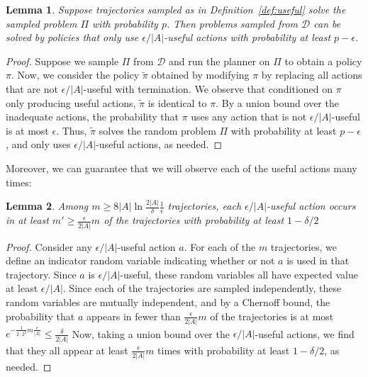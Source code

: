 \documentclass[letterpaper]{article} %
\newtheorem{lemma}{Lemma}
\begin{document}
\begin{lemma}\label{lem:only-useful}
Suppose trajectories sampled as in Definition~\ref{def:useful} solve the sampled problem $\Pi$ with probability $p$.
Then problems sampled from $\mathcal{D}$ can be solved by policies that only use $\epsilon/|A|$-useful actions with probability at least $p-\epsilon$.
\end{lemma}
\begin{proof}
Suppose we sample $\Pi$ from $\mathcal{D}$ and run the planner on $\Pi$ to obtain a policy $\pi$. 
Now, we consider the policy $\tilde{\pi}$ obtained by modifying $\pi$ by replacing all actions that are not $\epsilon/|A|$-useful with termination. We observe that conditioned on $\pi$ only producing useful actions, $\tilde{\pi}$ is identical to $\pi$. By a union bound over the inadequate actions, the probability that $\pi$ uses any action that is not $\epsilon/|A|$-useful is at most $\epsilon$.  Thus, $\tilde{\pi}$ solves the random problem $\Pi$ with probability at least $p-\epsilon$, and only uses $\epsilon/|A|$-useful actions, as needed.
\end{proof}

\noindent
Moreover, 
we can guarantee that we will observe each of the useful actions many times:

\begin{lemma}\label{lem:many-useful}
Among  $m \geq 8|A|\ln\frac{2|A|}{\delta}\frac{1}{\epsilon}$
trajectories, each $\epsilon/|A|$-useful action occurs in at least
$m' \geq \frac{\epsilon}{2|A|}m$
of the trajectories with probability at least $1-\delta/2$
\end{lemma}
\begin{proof}
Consider any $\epsilon/|A|$-useful action $a$. For each of the $m$ trajectories, we define an indicator random variable indicating whether or not $a$ is used in that trajectory. Since $a$ is $\epsilon/|A|$-useful, these random variables all have expected value at least $\epsilon/|A|$. Since each of the trajectories are sampled independently, these random variables are mutually independent, and by a Chernoff bound, the probability that $a$ appears in fewer than $\frac{\epsilon}{2|A|}m$ of the trajectories is at most
$
e^{-\frac{1}{2\cdot 2^2}m\frac{\epsilon}{|A|}}\leq\frac{\delta}{2|A|}
$
Now, taking a union bound over the $\epsilon/|A|$-useful actions, we find that they all appear at least $\frac{\epsilon}{2|A|}m$ times with probability at least $1-\delta/2$, as needed.
\end{proof}
\end{document}

